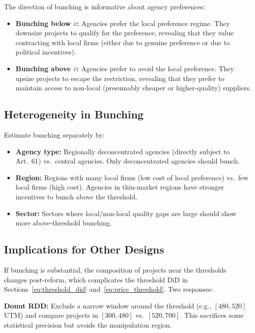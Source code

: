 \documentclass[12pt]{article}
\begin{document}
The direction of bunching is informative about agency preferences:
\begin{itemize}[itemsep=4pt]
    \item \textbf{Bunching below $\bar{v}$:} Agencies prefer the local preference regime. They downsize projects to qualify for the preference, revealing that they value contracting with local firms (either due to genuine preference or due to political incentives).
    \item \textbf{Bunching above $\bar{v}$:} Agencies prefer to avoid the local preference. They upsize projects to escape the restriction, revealing that they prefer to maintain access to non-local (presumably cheaper or higher-quality) suppliers.
\end{itemize}

\subsection{Heterogeneity in Bunching}

Estimate bunching separately by:
\begin{itemize}[itemsep=4pt]
    \item \textbf{Agency type:} Regionally deconcentrated agencies (directly subject to Art.\ 61) vs.\ central agencies. Only deconcentrated agencies should bunch.
    \item \textbf{Region:} Regions with many local firms (low cost of local preference) vs.\ few local firms (high cost). Agencies in thin-market regions have stronger incentives to bunch above the threshold.
    \item \textbf{Sector:} Sectors where local/non-local quality gaps are large should show more above-threshold bunching.
\end{itemize}

\subsection{Implications for Other Designs}

If bunching is substantial, the composition of projects near the thresholds changes post-reform, which complicates the threshold DiD in Sections~\ref{eq:threshold_did} and~\ref{eq:price_threshold}. Two responses:

\medskip
\noindent \textbf{Donut RDD:} Exclude a narrow window around the threshold (e.g., $[480, 520]$ UTM) and compare projects in $[300, 480]$ vs.\ $[520, 700]$. This sacrifices some statistical precision but avoids the manipulation region.
\end{document}
